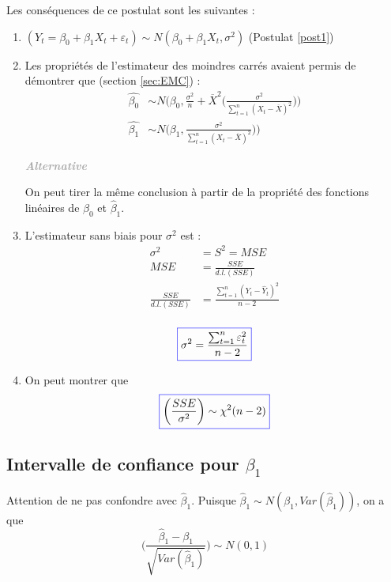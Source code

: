 \documentclass[11pt,french]{report}
\newenvironment{moreInfo}[1]
	{\begin{mdframed}
	\textcolor{darkgray}{\huge \raisebox{-3.5pt}{\faInfo} 
	\hspace{0.5cm} \large\bfseries #1}\\[5pt]
	\normalsize
	\makebox[0.1\textwidth][l]{}	
	\begin{minipage}{10cm}}
	{	\end{minipage}
	\end{mdframed}}
\begin{document}
Les conséquences de ce postulat sont les suivantes :
\begin{enumerate}
\item $(Y_t = \beta_0 + \beta_1X_t + \varepsilon_t) \sim N(\beta_0 + \beta_1X_t, \sigma^2)$ (Postulat \ref{post1})
\item Les propriétés de l'estimateur des moindres carrés avaient permis de démontrer que (section \ref{sec:EMC}) :
	\begin{align*}
	     \hat{\beta_0} &\sim N\Bigg(\beta_0, \frac{\sigma^2}{n}  + \overline{X}^2 \bigg(\frac{\sigma^2}{\sum_{t=1}^n (X_t - \overline{X})^2}\bigg)\Bigg) \\
	     \hat{\beta_1} &\sim N\Bigg(\beta_1, \frac{\sigma^2}{\sum_{t=1}^n(X_t - \overline{X})^2})\Bigg)
	\end{align*}
	
\begin{moreInfo}{\emph{Alternative}}
	On peut tirer la même conclusion à partir de la propriété des fonctions linéaires de $\hat{\beta}_0$ et $\hat{\beta}_1$.
\end{moreInfo}

\item L'estimateur sans biais pour $\sigma^2$ est :
\begin{align*}
\sigma^2 &= S^2 = MSE \\
MSE &= \frac{SSE}{d.l.(SSE)} \\
\frac{SSE}{d.l.(SSE)} &= \frac{\sum_{t=1}^n (Y_t - \hat{Y}_t)^2}{n-2} \\
\end{align*}

\begin{equation}
\label{eq:s2}
\color{blue}
\boxed{\color{black}
\sigma^2 = \frac{\sum_{t=1}^n \varepsilon_t^2}{n-2}}
\end{equation}

\item On peut montrer que 
\begin{equation}
\label{eq:ssesigma}
\color{blue}
\boxed{\color{black}
\bigg(\frac{SSE}{\sigma^2}\bigg) \sim \chi^2(n - 2) }
\end{equation}
\end{enumerate}

\subsection{Intervalle de confiance pour $\beta_1$}
Attention de ne pas confondre avec $\hat{\beta}_1$.
\bigskip
Puisque $ \hat{\beta}_1 \sim N(\beta_1, Var(\hat{\beta}_1))$, on a que 
$$
\Bigg(\frac{\hat{\beta}_1 - \beta_1}{\sqrt{Var(\hat{\beta}_1)}}\Bigg) \sim N(0,1)
$$
\end{document}
